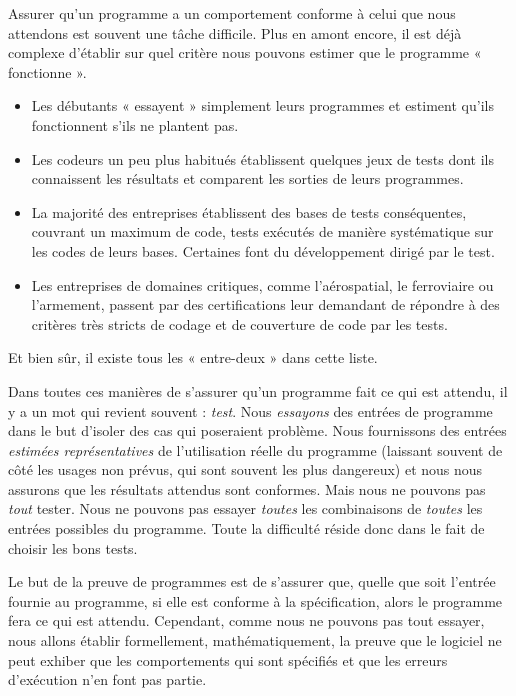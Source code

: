 

Assurer qu'un programme a un comportement conforme à celui que nous attendons
est souvent une tâche difficile. Plus en amont encore, il est déjà complexe
d'établir sur quel critère nous pouvons estimer que le programme « fonctionne ».



\begin{itemize}
\item Les débutants « essayent » simplement leurs programmes et estiment qu'ils
fonctionnent s'ils ne plantent pas.
\item Les codeurs un peu plus habitués établissent quelques jeux de tests dont ils
connaissent les résultats et comparent les sorties de leurs programmes.
\item La majorité des entreprises établissent des bases de tests conséquentes,
couvrant un maximum de code, tests exécutés de manière systématique sur les
codes de leurs bases. Certaines font du développement dirigé par le test.
\item Les entreprises de domaines critiques, comme l'aérospatial, le ferroviaire ou
l'armement, passent par des certifications leur demandant de répondre à des
critères très stricts de codage et de couverture de code par les tests.
\end{itemize}


Et bien sûr, il existe tous les « entre-deux » dans cette liste.



Dans toutes ces manières de s'assurer qu'un programme fait ce qui est attendu,
il y a un mot qui revient souvent : \textit{test}. Nous \textit{essayons} des entrées de
programme dans le but d'isoler des cas qui poseraient problème. Nous fournissons
des entrées \textit{estimées représentatives} de l'utilisation réelle du programme
(laissant souvent de côté les usages non prévus, qui sont souvent les plus
dangereux) et
nous nous assurons que les résultats attendus sont conformes. Mais nous ne
pouvons pas \textit{tout} tester. Nous ne pouvons pas essayer \textit{toutes} les
combinaisons de \textit{toutes} les entrées possibles du programme. Toute la
difficulté réside donc dans le fait de choisir les bons tests.



Le but de la preuve de programmes est de s'assurer que, quelle que soit l'entrée
fournie au programme, si elle est conforme à la spécification, alors le programme
fera ce qui est attendu. Cependant, comme nous ne pouvons pas tout essayer, nous
allons établir formellement, mathématiquement, la preuve que le logiciel ne
peut exhiber que les comportements qui sont spécifiés et que les erreurs
d'exécution n'en font pas partie.



